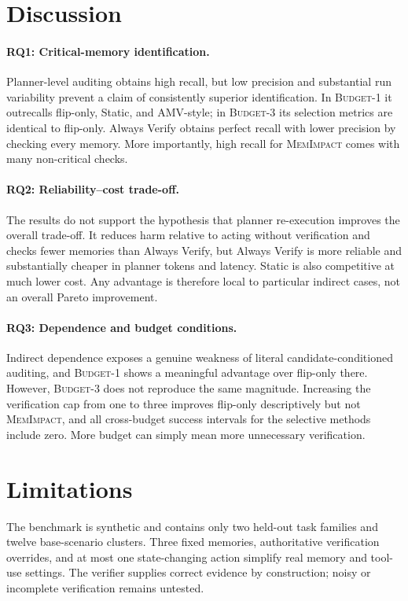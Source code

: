 \documentclass[11pt]{article}
\newcommand{\method}{\textsc{MemImpact}\xspace}
\newcommand{\BOne}{\textsc{Budget-1}\xspace}
\newcommand{\BThree}{\textsc{Budget-3}\xspace}
\begin{document}
\section{Discussion}

\paragraph{RQ1: Critical-memory identification.} Planner-level auditing obtains high recall, but low precision and substantial run variability prevent a claim of consistently superior identification. In \BOne it outrecalls flip-only, Static, and AMV-style; in \BThree its selection metrics are identical to flip-only. Always Verify obtains perfect recall with lower precision by checking every memory. More importantly, high recall for \method comes with many non-critical checks.

\paragraph{RQ2: Reliability--cost trade-off.} The results do not support the hypothesis that planner re-execution improves the overall trade-off. It reduces harm relative to acting without verification and checks fewer memories than Always Verify, but Always Verify is more reliable and substantially cheaper in planner tokens and latency. Static is also competitive at much lower cost. Any advantage is therefore local to particular indirect cases, not an overall Pareto improvement.

\paragraph{RQ3: Dependence and budget conditions.} Indirect dependence exposes a genuine weakness of literal candidate-conditioned auditing, and \BOne shows a meaningful advantage over flip-only there. However, \BThree does not reproduce the same magnitude. Increasing the verification cap from one to three improves flip-only descriptively but not \method, and all cross-budget success intervals for the selective methods include zero. More budget can simply mean more unnecessary verification.

\section{Limitations}

The benchmark is synthetic and contains only two held-out task families and twelve base-scenario clusters. Three fixed memories, authoritative verification overrides, and at most one state-changing action simplify real memory and tool-use settings. The verifier supplies correct evidence by construction; noisy or incomplete verification remains untested.
\end{document}
